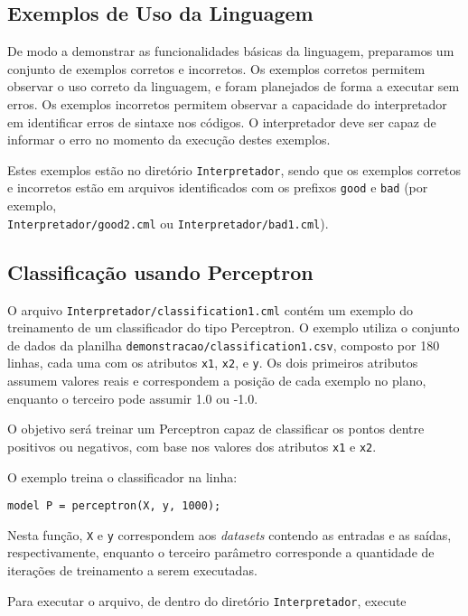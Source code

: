 \documentclass[12pt]{article}
\begin{document}
\subsection{Exemplos de Uso da Linguagem}

De modo a demonstrar as funcionalidades básicas da linguagem, preparamos um conjunto de exemplos corretos e incorretos. Os exemplos corretos permitem observar o uso correto da linguagem, e foram planejados de forma a executar sem erros. Os exemplos incorretos permitem observar a capacidade do interpretador em identificar erros de sintaxe nos códigos. O interpretador deve ser capaz de informar o erro no momento da execução destes exemplos.

Estes exemplos estão no diretório \texttt{Interpretador}, sendo que os exemplos corretos e incorretos estão em arquivos identificados com os prefixos \texttt{good} e \texttt{bad} (por exemplo,\\ \texttt{Interpretador/good2.cml} ou \texttt{Interpretador/bad1.cml}).

\subsection{Classificação usando Perceptron}
O arquivo \texttt{Interpretador/classification1.cml} contém um exemplo do treinamento de um classificador do tipo Perceptron. O exemplo utiliza o conjunto de dados da planilha \texttt{demonstracao/classification1.csv}, composto por 180 linhas, cada uma com os atributos \texttt{x1}, \texttt{x2}, e \texttt{y}. Os dois primeiros atributos assumem valores reais e correspondem a posição de cada exemplo no plano, enquanto o terceiro pode assumir 1.0 ou -1.0.

O objetivo será treinar um Perceptron capaz de classificar os pontos dentre positivos ou negativos, com base nos valores dos atributos \texttt{x1} e \texttt{x2}.

O exemplo treina o classificador na linha:

\begin{verbatim}
model P = perceptron(X, y, 1000);
\end{verbatim}

Nesta função, \texttt{X} e \texttt{y} correspondem aos \textit{datasets} contendo as entradas e as saídas, respectivamente, enquanto o terceiro parâmetro corresponde a quantidade de iterações de treinamento a serem executadas.

Para executar o arquivo, de dentro do diretório \texttt{Interpretador}, execute
\end{document}
